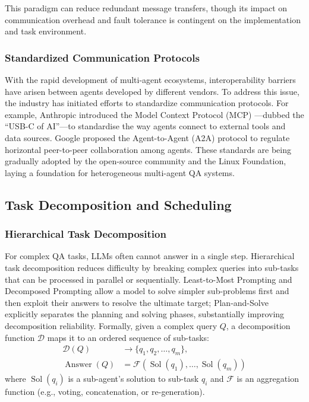 This paradigm can reduce redundant message transfers, though its impact on communication overhead and fault tolerance is contingent on the implementation and task environment.

\subsubsection{Standardized Communication Protocols}
\label{sec:protocols}
With the rapid development of multi-agent ecosystems, interoperability barriers have arisen between agents developed by different vendors.
To address this issue, the industry has initiated efforts to standardize communication protocols. For example, Anthropic introduced the Model Context Protocol (MCP)
\citep{anthropic2024mcp}—dubbed the ``USB-C of AI''—to standardise
the way agents connect to external tools and data sources.
Google proposed the Agent-to-Agent (A2A) protocol \citep{google2025a2a} to
regulate horizontal peer-to-peer collaboration among agents.
These standards are being gradually adopted by the open-source
community and the Linux Foundation, laying a foundation for heterogeneous
multi-agent QA systems.

\subsection{Task Decomposition and Scheduling}
\label{sec:task_decomp}

\subsubsection{Hierarchical Task Decomposition}
\label{sec:hier_decomp}

For complex QA tasks, LLMs often cannot answer in a single step.
Hierarchical task decomposition reduces difficulty by breaking complex queries
into sub-tasks that can be processed in parallel or sequentially.
Least-to-Most Prompting \citep{zhou2023least_to_most} and Decomposed
Prompting \citep{khot2023decomposed_prompting} allow a model to solve simpler
sub-problems first and then exploit their answers to resolve the ultimate
target; Plan-and-Solve \citep{wang2023plan_and_solve} explicitly separates
the planning and solving phases, substantially improving decomposition
reliability.
Formally, given a complex query $Q$, a decomposition function $\mathcal{D}$
maps it to an ordered sequence of sub-tasks:
\begin{equation}
  \begin{aligned}
    \mathcal{D}(Q) &\to \{q_1, q_2, \ldots, q_m\}, \\
    \operatorname{Answer}(Q) &=
    \mathcal{F}\!\left(\operatorname{Sol}(q_1),\ldots,\operatorname{Sol}(q_m)\right)
  \end{aligned}
  \label{eq:decompose}
\end{equation}
where $\operatorname{Sol}(q_i)$ is a sub-agent's solution to sub-task $q_i$
and $\mathcal{F}$ is an aggregation function (e.g., voting, concatenation, or
re-generation).

